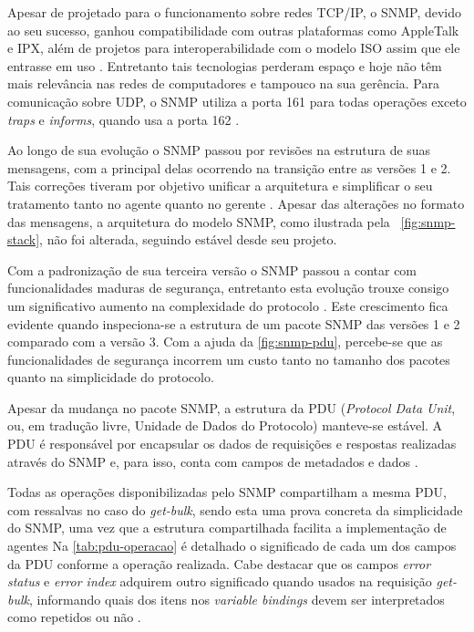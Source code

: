\documentclass[twoside,english,brazilian]{UNISINOSmonografia}
\begin{document}
Apesar de projetado para o funcionamento sobre redes TCP/IP, o SNMP, devido ao 
seu sucesso, ganhou compatibilidade com outras plataformas como AppleTalk e 
IPX, além de projetos para interoperabilidade com o modelo ISO 
assim que ele entrasse em uso \cite{Hunt1997}.
Entretanto tais tecnologias perderam espaço e hoje não têm mais relevância nas 
redes de computadores e tampouco na sua gerência.
Para comunicação sobre UDP, o SNMP utiliza a porta 161 para todas operações 
exceto \textit{traps} e \textit{informs}, quando usa a porta 162 
\cite{Mauro2009}.


Ao longo de sua evolução o SNMP passou por revisões na estrutura de suas 
mensagens, com a principal delas ocorrendo na transição entre as versões 1 e 2.
Tais correções tiveram por objetivo unificar a arquitetura e 
simplificar o seu tratamento tanto no agente quanto no gerente 
\cite{perkins1997understanding}.
Apesar das alterações no formato das mensagens, a arquitetura do modelo SNMP, 
como ilustrada pela ~\autoref{fig:snmp-stack}, não foi alterada, 
seguindo estável desde seu projeto.


Com a padronização de sua terceira versão o SNMP passou a contar com 
funcionalidades maduras de segurança, entretanto esta evolução trouxe 
consigo um significativo aumento na complexidade do protocolo
\cite{Mauro2009}.
Este crescimento fica evidente quando inspeciona-se a estrutura de um pacote 
SNMP das versões 1 e 2 comparado com a versão 3.
Com a ajuda da \autoref{fig:snmp-pdu}, percebe-se que as funcionalidades de 
segurança incorrem um custo tanto no tamanho dos pacotes quanto na 
simplicidade do protocolo.


Apesar da mudança no pacote SNMP, a estrutura da PDU (\textit{Protocol Data 
Unit}, ou, em tradução livre, Unidade de Dados do Protocolo) manteve-se 
estável.
A PDU é responsável por encapsular os dados de requisições e respostas 
realizadas através do SNMP e, para isso, conta com campos de metadados 
e dados \cite{perkins1997understanding}.


Todas as operações disponibilizadas pelo SNMP compartilham a mesma PDU, 
com ressalvas no caso do \textit{get-bulk}, sendo esta uma prova concreta
da simplicidade do SNMP, uma vez que a estrutura compartilhada facilita
a implementação de agentes \cite{Clemm2006}
Na \autoref{tab:pdu-operacao} é detalhado o significado de cada um dos
campos da PDU conforme a operação realizada.
Cabe destacar que os campos \textit{error status} e \textit{error index} 
adquirem outro significado quando usados na requisição \textit{get-bulk},
informando quais dos itens nos \textit{variable bindings} devem ser 
interpretados como repetidos ou não \cite{perkins1997understanding}.
\end{document}
